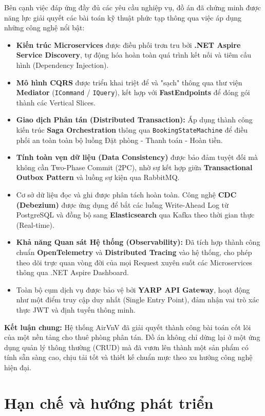 Bên cạnh việc đáp ứng đầy đủ các yêu cầu nghiệp vụ, đồ án đã chứng minh được năng lực giải quyết các bài toán kỹ thuật phức tạp thông qua việc áp dụng những công nghệ nổi bật:
\begin{itemize}
    \item \textbf{Kiến trúc Microservices} được điều phối trơn tru bởi \textbf{.NET Aspire Service Discovery}, tự động hóa hoàn toàn quá trình kết nối và tiêm cấu hình (Dependency Injection).
    \item \textbf{Mô hình CQRS} được triển khai triệt để và "sạch" thông qua thư viện \textbf{Mediator} (\texttt{ICommand} / \texttt{IQuery}), kết hợp với \textbf{FastEndpoints} để đóng gói thành các Vertical Slices.
    \item \textbf{Giao dịch Phân tán (Distributed Transaction):} Áp dụng thành công kiến trúc \textbf{Saga Orchestration} thông qua \texttt{BookingStateMachine} để điều phối an toàn toàn bộ luồng Đặt phòng - Thanh toán - Hoàn tiền.
    \item \textbf{Tính toàn vẹn dữ liệu (Data Consistency)} được bảo đảm tuyệt đối mà không cần Two-Phase Commit (2PC), nhờ sự kết hợp giữa \textbf{Transactional Outbox Pattern} và luồng sự kiện qua RabbitMQ.
    \item Cơ sở dữ liệu đọc và ghi được phân tách hoàn toàn. Công nghệ \textbf{CDC (Debezium)} được ứng dụng để bắt các luồng Write-Ahead Log từ PostgreSQL và đồng bộ sang \textbf{Elasticsearch} qua Kafka theo thời gian thực (Real-time).
    \item \textbf{Khả năng Quan sát Hệ thống (Observability):} Đã tích hợp thành công chuẩn \textbf{OpenTelemetry} và \textbf{Distributed Tracing} vào hệ thống, cho phép theo dõi trực quan vòng đời của mọi Request xuyên suốt các Microservices thông qua .NET Aspire Dashboard.
    \item Toàn bộ cụm dịch vụ được bảo vệ bởi \textbf{YARP API Gateway}, hoạt động như một điểm truy cập duy nhất (Single Entry Point), đảm nhận vai trò xác thực JWT và định tuyến thông minh.
\end{itemize}

\textbf{Kết luận chung:} Hệ thống AirVnV đã giải quyết thành công bài toán cốt lõi của một nền tảng cho thuê phòng phân tán. Đồ án không chỉ dừng lại ở một ứng dụng quản lý thông thường (CRUD) mà đã vươn lên thành một sản phẩm có tính sẵn sàng cao, chịu tải tốt và thiết kế chuẩn mực theo xu hướng công nghệ hiện đại.

\section{Hạn chế và hướng phát triển}
\label{sec:han_che_huong_phat_trien}


